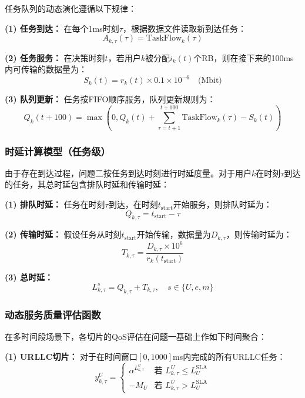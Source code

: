 任务队列的动态演化遵循以下规律：

\textbf{(1) 任务到达：}
在每个1ms时刻$\tau$，根据数据文件读取新到达任务：
\begin{equation}
A_{k,\tau}(\tau) = \text{TaskFlow}_k(\tau)
\end{equation}

\textbf{(2) 任务服务：}
在决策时刻$t$，若用户$k$被分配$i_k(t)$个RB，则在接下来的100ms内可传输的数据量为：
\begin{equation}
S_k(t) = r_k(t) \times 0.1 \times 10^{-6} \quad \text{(Mbit)}
\end{equation}

\textbf{(3) 队列更新：}
任务按FIFO顺序服务，队列更新规则为：
\begin{equation}
\label{eq:queue_evolution}
Q_k(t+100) = \max\left(0, Q_k(t) + \sum_{\tau=t+1}^{t+100} \text{TaskFlow}_k(\tau) - S_k(t)\right)
\end{equation}

\subsubsection{时延计算模型（任务级）}
 
由于存在到达过程，问题二按任务到达时刻进行时延度量。对于用户$k$在时刻$\tau$到达的任务，其总时延包含排队时延和传输时延：

\textbf{(1) 排队时延：}
任务在时刻$\tau$到达，在时刻$t_{\text{start}}$开始服务，则排队时延为：
\begin{equation}
Q_{k,\tau} = t_{\text{start}} - \tau
\end{equation}

\textbf{(2) 传输时延：}
假设任务从时刻$t_{\text{start}}$开始传输，数据量为$D_{k,\tau}$，则传输时延为：
\begin{equation}
T_{k,\tau} = \frac{D_{k,\tau} \times 10^6}{r_k(t_{\text{start}})}
\end{equation}

\textbf{(3) 总时延：}
\begin{equation}
L_{k,\tau}^s = Q_{k,\tau} + T_{k,\tau}, \quad s \in \{U, e, m\}
\end{equation}

\subsubsection{动态服务质量评估函数}
 
在多时间段场景下，各切片的QoS评估在问题一基础上作如下时间聚合：

\textbf{(1) URLLC切片：}
对于在时间窗口$[0, 1000]$ms内完成的所有URLLC任务：
\begin{equation}
y_{k,\tau}^{U} = \begin{cases}
\alpha^{L_{k,\tau}^{U}} & \text{若 } L_{k,\tau}^{U} \leq L_{U}^{\text{SLA}} \\
-M_{U} & \text{若 } L_{k,\tau}^{U} > L_{U}^{\text{SLA}}
\end{cases}
\end{equation}


